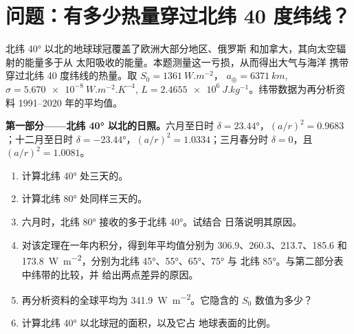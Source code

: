 \section{问题：有多少热量穿过北纬 40 度纬线？}

\begin{problem}
\label{pb:b1:radiation-heat-transport:1}
北纬 \ang{40} 以北的地球球冠覆盖了欧洲大部分地区、俄罗斯
和加拿大，其向太空辐射的能量多于从
太阳吸收的能量。本题测量这一亏损，从而得出大气与海洋
携带穿过北纬 40 度纬线的热量。取 $S_0 = \qty{1361}{W.m^{-2}}$，
$a_\oplus = \qty{6371}{km}$, $\sigma = \qty{5.670e-8}{W.m^{-2}.K^{-4}}$, $L =
\qty{2.4655e6}{J.kg^{-1}}$。纬带数据为再分析资料 1991--2020 年的平均值。

\medskip
\noindent\textbf{第一部分——北纬 \ang{40} 以北的日照。}六月至日时
$\delta = \ang{23.44}$，$(a/r)^2 = 0.9683$；十二月至日时 $\delta =
\ang{-23.44}$，$(a/r)^2 = 1.0334$；三月春分时 $\delta = 0$，且
$(a/r)^2 = 1.0081$。
\begin{enumerate}
  \item 计算北纬 \ang{40} 处三天的。
  \item 计算北纬 \ang{80} 处同样三天的。
  \item 六月时，北纬 \ang{80} 接收的多于北纬 \ang{40}。试结合
        日落说明其原因。
  \item 对该定理在一年内积分，得到年平均值分别为
        \qty{306.9}{}、\qty{260.3}{}、\qty{213.7}{}、\qty{185.6}{} 和
        \qty{173.8}{W.m^{-2}}，分别为北纬 \ang{45}、\ang{55}、\ang{65}、\ang{75} 与
        北纬 \ang{85}。与第二部分表中纬带的比较，并
        给出两点差异的原因。
  \item 再分析资料的全球平均为 \qty{341.9}{W.m^{-2}}。它隐含的
        $S_0$ 数值为多少？
  \item 计算北纬 \ang{40} 以北球冠的面积，以及它占
        地球表面的比例。
\end{enumerate}


\end{problem}
